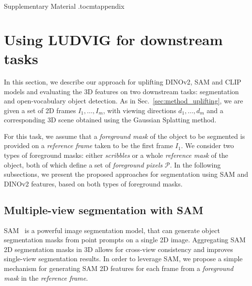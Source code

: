 
\renewcommand{\thefigure}{\Alph{figure}}
\renewcommand{\thetable}{\Alph{table}}

\clearpage
\appendix

\setcounter{figure}{0}    
\setcounter{table}{0}    

{\Large{Supplementary Material}}
\etocdepthtag.toc{mtappendix}

{
  \hypersetup{linkcolor=ForestGreen}
  \tableofcontents
}

\section{Using LUDVIG for downstream tasks}
\label{sec:appendix-method_seg}

In this section, we describe our approach for uplifting DINOv2, SAM and CLIP models and evaluating the 3D features on two downstream tasks: segmentation and open-vocabulary object detection.
%
As in Sec.~\ref{sec:method_uplifting}, we are given a set of 2D  frames $I_1,\dots, I_m$, with viewing directions $d_1,\dots, d_m$ and a corresponding 3D scene obtained using the Gaussian Splatting method.  

 For this task, we assume that a \textit{foreground mask} of the object to be segmented is provided on a \emph{reference frame} taken to be the first frame $I_1$.
We consider two types of foreground masks: either \emph{scribbles} or a whole \emph{reference mask} of the object, both of which define a set of \textit{foreground pixels} $\mathcal{P}$. 
In the following subsections, we present the proposed approaches for segmentation using SAM and DINOv2 features, based on both types of foreground masks.


\subsection{Multiple-view segmentation with SAM}\label{sec:appendix-sam_seg}

SAM~\citep{kirillov2023sam, ravi2024sam2} is a powerful image segmentation model, that can generate object segmentation masks from point prompts on a single 2D image.
Aggregating SAM 2D segmentation masks in 3D allows for cross-view consistency and improves single-view segmentation results.
In order to leverage SAM, we propose a simple mechanism for generating SAM 2D features for each frame from a \textit{foreground mask} in the \textit{reference frame}.

